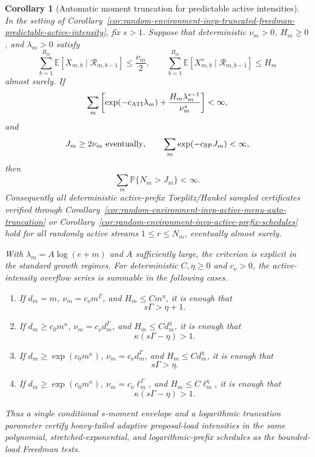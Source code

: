 \documentclass[11pt]{amsart}
\numberwithin{equation}{section}
\newtheorem{corollary}[theorem]{Corollary}
\theoremstyle{definition}
\theoremstyle{remark}
\newcommand{\Prob}{\mathbb P}
\newcommand{\Exp}{\mathbb E}
\begin{document}
\begin{corollary}[Automatic moment truncation for predictable active intensities]
\label{cor:random-environment-invp-auto-truncation-predictable-active-intensity}
In the setting of
Corollary~\ref{cor:random-environment-invp-truncated-freedman-predictable-active-intensity},
fix \(s>1\).  Suppose that deterministic \(\nu_m>0\), \(H_m\ge0\), and
\(\lambda_m>0\) satisfy
\[
  \sum_{b=1}^{B_m}
  \Exp[X_{m,b}\mid\mathcal R_{m,b-1}]\le\frac{\nu_m}{2},
  \qquad
  \sum_{b=1}^{B_m}
  \Exp[X_{m,b}^s\mid\mathcal R_{m,b-1}]\le H_m
\]
almost surely.  If
\[
  \sum_m
  \left[
    \exp(-c_{\rm ATI}\lambda_m)
    +\frac{H_m\lambda_m^{s-1}}{\nu_m^s}
  \right]<\infty,
\]
and
\[
  J_m\ge2\nu_m\ \text{eventually},
  \qquad
  \sum_m\exp(-c_{\rm SP}J_m)<\infty,
\]
then
\[
  \sum_m\Prob\{N_m>J_m\}<\infty .
\]
Consequently all deterministic active-prefix Toeplitz/Hankel sampled
certificates verified through
Corollary~\ref{cor:random-environment-invp-active-menu-auto-truncation} or
Corollary~\ref{cor:random-environment-invp-active-prefix-schedules} hold for
all randomly active streams \(1\le r\le N_m\), eventually almost surely.

With \(\lambda_m=A\log(e+m)\) and \(A\) sufficiently large, the criterion is
explicit in the standard growth regimes.  For deterministic
\(C,\eta\ge0\) and \(c_\nu>0\), the active-intensity overflow series is
summable in the following cases.
\begin{enumerate}[label=\textup{(\roman*)},leftmargin=2.2em]
\item If \(d_m=m\), \(\nu_m=c_\nu m^\Gamma\), and \(H_m\le Cm^\eta\), it is
enough that
\[
  s\Gamma>\eta+1 .
\]
\item If \(d_m\ge c_0m^\kappa\), \(\nu_m=c_\nu d_m^\Gamma\), and
\(H_m\le Cd_m^\eta\), it is enough that
\[
  \kappa(s\Gamma-\eta)>1 .
\]
\item If \(d_m\ge\exp(c_0m^\kappa)\), \(\nu_m=c_\nu d_m^\Gamma\), and
\(H_m\le Cd_m^\eta\), it is enough that
\[
  s\Gamma>\eta .
\]
\item If \(d_m\ge\exp(c_0m^\kappa)\), \(\nu_m=c_\nu\ell_m^\Gamma\), and
\(H_m\le C\ell_m^\eta\), it is enough that
\[
  \kappa(s\Gamma-\eta)>1 .
\]
\end{enumerate}
Thus a single conditional \(s\)-moment envelope and a logarithmic truncation
parameter certify heavy-tailed adaptive proposal-load intensities in the same
polynomial, stretched-exponential, and logarithmic-prefix schedules as the
bounded-load Freedman tests.
\end{corollary}
\end{document}
